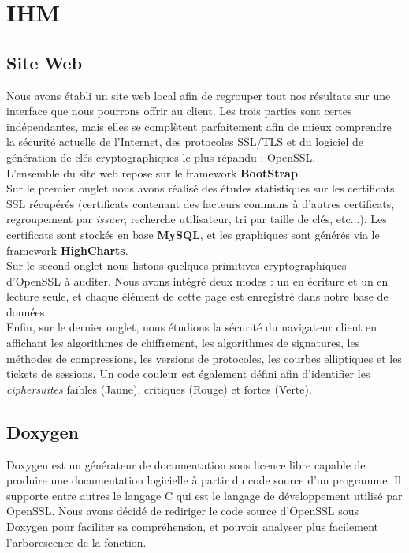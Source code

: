 \section{IHM}

\subsection{Site Web}

Nous avons établi un site web local afin de regrouper tout nos résultats sur une interface que nous pourrons offrir au client. Les trois parties sont certes indépendantes, mais elles se complètent parfaitement afin de mieux comprendre la sécurité actuelle de l'Internet, des protocoles SSL/TLS et du logiciel de génération de clés cryptographiques le plus répandu : OpenSSL.\\



L'ensemble du site web repose sur le framework \textbf{BootStrap}.\\


Sur le premier onglet nous avons réalisé des études statistiques sur les certificats SSL récupérés (certificats contenant des facteurs communs à d'autres certificats, regroupement par \textit{issuer}, recherche utilisateur, tri par taille de clés, etc...). Les certificats sont stockés en base \textbf{MySQL}, et les graphiques sont générés via le framework \textbf{HighCharts}.\\


Sur le second onglet nous listons quelques primitives cryptographiques d'OpenSSL à auditer. Nous avons intégré deux modes : un en écriture et un en lecture seule, et chaque élément de cette page est enregistré dans notre base de données.\\


Enfin, sur le dernier onglet, nous étudions la sécurité du navigateur client en affichant les algorithmes de chiffrement, les algorithmes de signatures, les méthodes de compressions, les versions de protocoles, les courbes elliptiques et les tickets de sessions. Un code couleur est également défini afin d'identifier les \textit{ciphersuites} faibles (Jaune), critiques (Rouge) et fortes (Verte).

\subsection{Doxygen}

Doxygen est un générateur de documentation sous licence libre capable de produire une documentation logicielle à partir du code source d'un programme. Il supporte entre autres le langage C qui est le langage de développement utilisé par OpenSSL. Nous avons décidé de rediriger le code source d'OpenSSL sous Doxygen pour faciliter sa compréhension, et pouvoir analyser plus facilement l'arborescence de la fonction.\\

